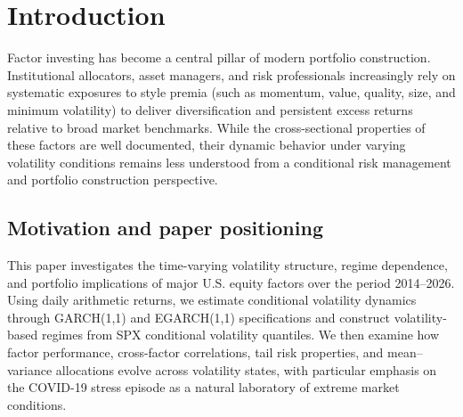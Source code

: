 \documentclass{article}
\begin{document}
\newpage

\section{Introduction}

Factor investing has become a central pillar of modern portfolio construction. 
Institutional allocators, asset managers, and risk professionals increasingly rely on systematic exposures to style premia (such as momentum, value, quality, size, and minimum volatility) to deliver diversification and persistent excess returns relative to broad market benchmarks. 
While the cross-sectional properties of these factors are well documented, their dynamic behavior under varying volatility conditions remains less understood from a conditional risk management and portfolio construction perspective.\newline

\subsection{Motivation and paper positioning} 

This paper investigates the time-varying volatility structure, regime dependence, and portfolio implications of major U.S. equity factors over the period 2014–2026. Using daily arithmetic returns, we estimate conditional volatility dynamics through GARCH(1,1) and EGARCH(1,1) specifications and construct volatility-based regimes from SPX conditional volatility quantiles. We then examine how factor performance, cross-factor correlations, tail risk properties, and mean–variance allocations evolve across volatility states, with particular emphasis on the COVID-19 stress episode as a natural laboratory of extreme market conditions.\newline
\end{document}
